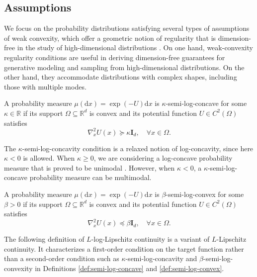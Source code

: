 \documentclass[twoside,11pt]{article}
\def\sR{{\mathbb{R}}}
\newcommand{\diff}{\mathrm{d}}
\numberwithin{equation}{section}
\begin{document}
\subsection{Assumptions}

We focus on the probability distributions satisfying several types of assumptions of weak convexity, which offer a geometric notion of regularity that is dimension-free in the study of high-dimensional distributions \citep{klartag2010high}. On one hand, weak-convexity regularity conditions are useful in deriving dimension-free guarantees for generative modeling and sampling from high-dimensional distributions. On the other hand, they accommodate distributions with complex shapes, including those with multiple modes.

\begin{definition} 
\label{def:semi-log-concave}
A probability measure $\mu (\diff x) = \exp(-U) \diff x$ is $\kappa$-semi-log-concave for some $\kappa \in \sR$ if its support $\Omega \subseteq \sR^d$ is convex and its potential function $U \in C^2(\Omega)$ satisfies
\begin{equation*}
\nabla^2_x U(x) \succeq \kappa \mathbf{I}_d, \quad \forall x \in \Omega.
\end{equation*}
\end{definition}

The $\kappa$-semi-log-concavity condition is a relaxed notion of log-concavity, since here $\kappa < 0$ is allowed. When $\kappa \ge 0$, we are considering a log-concave probability measure that is proved to be unimodal \citep{saumard2014log}. However, when $\kappa < 0$, a $\kappa$-semi-log-concave probability measure can be multimodal.


\begin{definition} 
\label{def:semi-log-convex}
A probability measure $\mu (\diff x) = \exp(-U) \diff x$ is $\beta$-semi-log-convex for some $\beta > 0$ if its support $\Omega \subseteq \sR^d$ is convex and its potential function $U \in C^2(\Omega)$ satisfies
\begin{equation*}
\nabla^2_x U(x) \preceq \beta \mathbf{I}_d, \quad \forall x \in \Omega.
\end{equation*}
\end{definition}

The following definition of $L$-log-Lipschitz continuity is a variant of $L$-Lipschitz continuity. It characterizes a first-order condition on the target function rather than a second-order condition such as $\kappa$-semi-log-concavity and $\beta$-semi-log-convexity in Definitions \ref{def:semi-log-concave} and \ref{def:semi-log-convex}.
\end{document}
